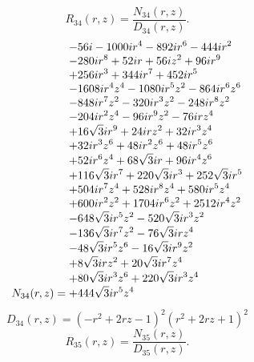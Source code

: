 \documentclass[11pt,a4paper]{article}
\begin{document}
\begin{equation}
R_{34}(r,z)=\frac{N_{34}(r,z)}{D_{34}(r,z)}.
\label{eq:cat-rational-34}
\end{equation}
\begin{equation}
N_{34}(r,z)=\shortstack[l]{$\displaystyle  - 56 i - 1000 i r^{4} - 892 i r^{6} - 444 i r^{2}$\\
$\displaystyle  - 280 i r^{8} + 52 i r + 56 i z^{2} + 96 i r^{9}$\\
$\displaystyle  + 256 i r^{3} + 344 i r^{7} + 452 i r^{5}$\\
$\displaystyle  - 1608 i r^{4} z^{4} - 1080 i r^{5} z^{2} - 864 i r^{6} z^{6}$\\
$\displaystyle  - 848 i r^{7} z^{2} - 320 i r^{3} z^{2} - 248 i r^{8} z^{2}$\\
$\displaystyle  - 204 i r^{2} z^{4} - 96 i r^{9} z^{2} - 76 i r z^{4}$\\
$\displaystyle  + 16 \sqrt{3} i r^{9} + 24 i r z^{2} + 32 i r^{3} z^{4}$\\
$\displaystyle  + 32 i r^{3} z^{6} + 48 i r^{2} z^{6} + 48 i r^{5} z^{6}$\\
$\displaystyle  + 52 i r^{6} z^{4} + 68 \sqrt{3} i r + 96 i r^{4} z^{6}$\\
$\displaystyle  + 116 \sqrt{3} i r^{7} + 220 \sqrt{3} i r^{3} + 252 \sqrt{3} i r^{5}$\\
$\displaystyle  + 504 i r^{7} z^{4} + 528 i r^{8} z^{4} + 580 i r^{5} z^{4}$\\
$\displaystyle  + 600 i r^{2} z^{2} + 1704 i r^{6} z^{2} + 2512 i r^{4} z^{2}$\\
$\displaystyle  - 648 \sqrt{3} i r^{5} z^{2} - 520 \sqrt{3} i r^{3} z^{2}$\\
$\displaystyle  - 136 \sqrt{3} i r^{7} z^{2} - 76 \sqrt{3} i r z^{4}$\\
$\displaystyle  - 48 \sqrt{3} i r^{5} z^{6} - 16 \sqrt{3} i r^{9} z^{2}$\\
$\displaystyle  + 8 \sqrt{3} i r z^{2} + 20 \sqrt{3} i r^{7} z^{4}$\\
$\displaystyle  + 80 \sqrt{3} i r^{3} z^{6} + 220 \sqrt{3} i r^{3} z^{4}$\\
$\displaystyle  + 444 \sqrt{3} i r^{5} z^{4}$}
\label{eq:cat-numerator-34}
\end{equation}
\begin{equation}
D_{34}(r,z)=\left(- r^{2} + 2 r z - 1\right)^{2} \left(r^{2} + 2 r z + 1\right)^{2}
\label{eq:cat-denominator-34}
\end{equation}
\begin{equation}
R_{35}(r,z)=\frac{N_{35}(r,z)}{D_{35}(r,z)}.
\label{eq:cat-rational-35}
\end{equation}
\end{document}
